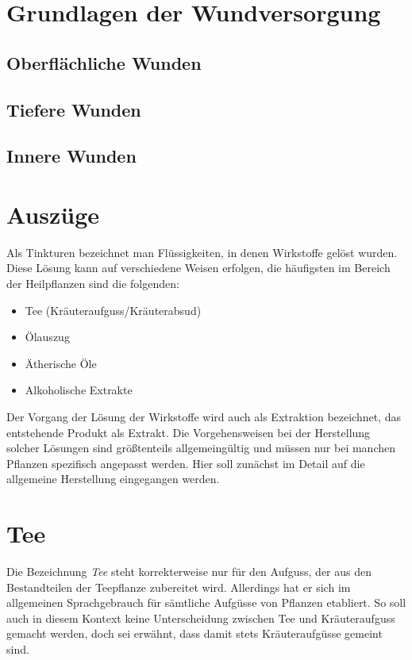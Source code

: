\section{Grundlagen der Wundversorgung}


\subsection{Oberflächliche Wunden}


\subsection{Tiefere Wunden}


\subsection{Innere Wunden}






\section{Auszüge}

Als Tinkturen bezeichnet man Flüssigkeiten, in denen Wirkstoffe gelöst wurden. Diese Lösung kann auf verschiedene Weisen erfolgen, die häufigsten im Bereich der Heilpflanzen sind die folgenden:
\begin{itemize}
	\item Tee (Kräuteraufguss/Kräuterabsud)
	\item Ölauszug
	\item Ätherische Öle
	\item Alkoholische Extrakte
\end{itemize}

Der Vorgang der Lösung der Wirkstoffe wird auch als Extraktion bezeichnet, das entstehende Produkt als Extrakt. Die Vorgehensweisen bei der Herstellung solcher Lösungen sind größtenteils allgemeingültig und müssen nur bei manchen Pflanzen spezifisch angepasst werden. Hier soll zunächst im Detail auf die allgemeine Herstellung eingegangen werden.

\section{Tee}
Die Bezeichnung \textit{Tee} steht korrekterweise nur für den Aufguss, der aus den Bestandteilen der Teepflanze zubereitet wird. Allerdings hat er sich im allgemeinen Sprachgebrauch für sämtliche Aufgüsse von Pflanzen etabliert. So soll auch in diesem Kontext keine Unterscheidung zwischen Tee und Kräuteraufguss gemacht werden, doch sei erwähnt, dass damit stets Kräuteraufgüsse gemeint sind.

